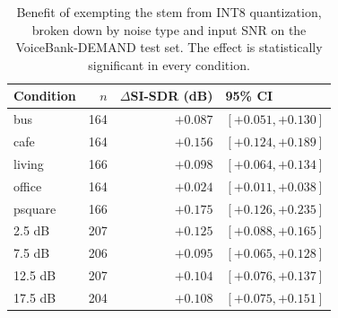 \begin{table}[t]
\centering
\caption{Benefit of exempting the stem from INT8 quantization, broken down by noise type and input SNR on the VoiceBank-DEMAND test set. The effect is statistically significant in every condition.}
\label{tab:condition_breakdown}
\begin{tabular}{lrrl}
\toprule
Condition & $n$ & $\Delta$SI-SDR (dB) & 95\% CI \\
\midrule
bus & 164 & $+0.087$ & $[+0.051, +0.130]$ \\
cafe & 164 & $+0.156$ & $[+0.124, +0.189]$ \\
living & 166 & $+0.098$ & $[+0.064, +0.134]$ \\
office & 164 & $+0.024$ & $[+0.011, +0.038]$ \\
psquare & 166 & $+0.175$ & $[+0.126, +0.235]$ \\
\midrule
2.5 dB & 207 & $+0.125$ & $[+0.088, +0.165]$ \\
7.5 dB & 206 & $+0.095$ & $[+0.065, +0.128]$ \\
12.5 dB & 207 & $+0.104$ & $[+0.076, +0.137]$ \\
17.5 dB & 204 & $+0.108$ & $[+0.075, +0.151]$ \\
\bottomrule
\end{tabular}
\end{table}
